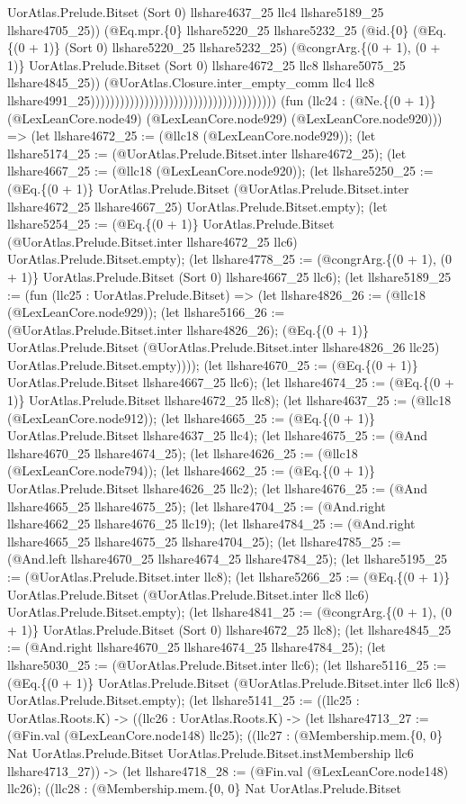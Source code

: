 \documentclass[11pt]{article}
\begin{document}
UorAtlas.Prelude.Bitset (Sort 0) llshare4637\_25 llc4 llshare5189\_25 llshare4705\_25)) (@Eq.mpr.\{0\} llshare5220\_25 llshare5232\_25 (@id.\{0\} (@Eq.\{(0 + 1)\} (Sort 0) llshare5220\_25 llshare5232\_25) (@congrArg.\{(0 + 1), (0 + 1)\} UorAtlas.Prelude.Bitset (Sort 0) llshare4672\_25 llc8 llshare5075\_25 llshare4845\_25)) (@UorAtlas.Closure.inter\_empty\_comm llc4 llc8 llshare4991\_25)))))))))))))))))))))))))))))))))))))) (fun (llc24 : (@Ne.\{(0 + 1)\} (@LexLeanCore.node49) (@LexLeanCore.node929) (@LexLeanCore.node920))) => (let llshare4672\_25 := (@llc18 (@LexLeanCore.node929)); (let llshare5174\_25 := (@UorAtlas.Prelude.Bitset.inter llshare4672\_25); (let llshare4667\_25 := (@llc18 (@LexLeanCore.node920)); (let llshare5250\_25 := (@Eq.\{(0 + 1)\} UorAtlas.Prelude.Bitset (@UorAtlas.Prelude.Bitset.inter llshare4672\_25 llshare4667\_25) UorAtlas.Prelude.Bitset.empty); (let llshare5254\_25 := (@Eq.\{(0 + 1)\} UorAtlas.Prelude.Bitset (@UorAtlas.Prelude.Bitset.inter llshare4672\_25 llc6) UorAtlas.Prelude.Bitset.empty); (let llshare4778\_25 := (@congrArg.\{(0 + 1), (0 + 1)\} UorAtlas.Prelude.Bitset (Sort 0) llshare4667\_25 llc6); (let llshare5189\_25 := (fun (llc25 : UorAtlas.Prelude.Bitset) => (let llshare4826\_26 := (@llc18 (@LexLeanCore.node929)); (let llshare5166\_26 := (@UorAtlas.Prelude.Bitset.inter llshare4826\_26); (@Eq.\{(0 + 1)\} UorAtlas.Prelude.Bitset (@UorAtlas.Prelude.Bitset.inter llshare4826\_26 llc25) UorAtlas.Prelude.Bitset.empty)))); (let llshare4670\_25 := (@Eq.\{(0 + 1)\} UorAtlas.Prelude.Bitset llshare4667\_25 llc6); (let llshare4674\_25 := (@Eq.\{(0 + 1)\} UorAtlas.Prelude.Bitset llshare4672\_25 llc8); (let llshare4637\_25 := (@llc18 (@LexLeanCore.node912)); (let llshare4665\_25 := (@Eq.\{(0 + 1)\} UorAtlas.Prelude.Bitset llshare4637\_25 llc4); (let llshare4675\_25 := (@And llshare4670\_25 llshare4674\_25); (let llshare4626\_25 := (@llc18 (@LexLeanCore.node794)); (let llshare4662\_25 := (@Eq.\{(0 + 1)\} UorAtlas.Prelude.Bitset llshare4626\_25 llc2); (let llshare4676\_25 := (@And llshare4665\_25 llshare4675\_25); (let llshare4704\_25 := (@And.right llshare4662\_25 llshare4676\_25 llc19); (let llshare4784\_25 := (@And.right llshare4665\_25 llshare4675\_25 llshare4704\_25); (let llshare4785\_25 := (@And.left llshare4670\_25 llshare4674\_25 llshare4784\_25); (let llshare5195\_25 := (@UorAtlas.Prelude.Bitset.inter llc8); (let llshare5266\_25 := (@Eq.\{(0 + 1)\} UorAtlas.Prelude.Bitset (@UorAtlas.Prelude.Bitset.inter llc8 llc6) UorAtlas.Prelude.Bitset.empty); (let llshare4841\_25 := (@congrArg.\{(0 + 1), (0 + 1)\} UorAtlas.Prelude.Bitset (Sort 0) llshare4672\_25 llc8); (let llshare4845\_25 := (@And.right llshare4670\_25 llshare4674\_25 llshare4784\_25); (let llshare5030\_25 := (@UorAtlas.Prelude.Bitset.inter llc6); (let llshare5116\_25 := (@Eq.\{(0 + 1)\} UorAtlas.Prelude.Bitset (@UorAtlas.Prelude.Bitset.inter llc6 llc8) UorAtlas.Prelude.Bitset.empty); (let llshare5141\_25 := ((llc25 : UorAtlas.Roots.K) -> ((llc26 : UorAtlas.Roots.K) -> (let llshare4713\_27 := (@Fin.val (@LexLeanCore.node148) llc25); ((llc27 : (@Membership.mem.\{0, 0\} Nat UorAtlas.Prelude.Bitset UorAtlas.Prelude.Bitset.instMembership llc6 llshare4713\_27)) -> (let llshare4718\_28 := (@Fin.val (@LexLeanCore.node148) llc26); ((llc28 : (@Membership.mem.\{0, 0\} Nat UorAtlas.Prelude.Bitset 
\end{document}
